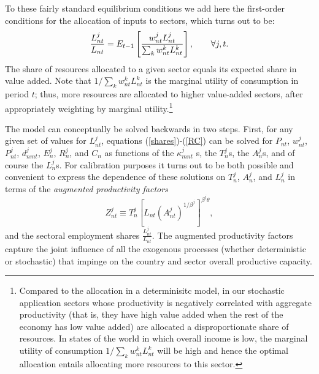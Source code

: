 \documentclass{article}
\begin{document}
To these fairly standard equilibrium conditions we add here the first-order
conditions for the allocation of inputs to sectors, which turns out to be: 
\begin{equation}
\frac{L_{nt}^{j}}{L_{nt}}=E_{t-1}\left[ \frac{w_{nt}^{j}L_{nt}^{j}}{%
\sum_{k}w_{nt}^{k}L_{nt}^{k}}\right] ,\qquad \forall j,t.  \label{eq:FOC}
\end{equation}%
The share of resources allocated to a given sector equals its expected share
in value added. Note that $1/\sum_{k}w_{nt}^{k}L_{nt}^{k}$ is the marginal
utility of consumption in period $t$; thus, more resources are allocated to
higher value-added sectors, after appropriately weighting by marginal
utility.\footnote{%
Compared to the allocation in a determinisitc model, in our stochastic
application sectors whose productivity is negatively correlated with
aggregate productivity (that is, they have high value added when the rest of
the economy has low value added) are allocated a disproportionate share of
resources. In states of the world in which overall income is low, the
marginal utility of consumption $1/\sum_{k}w_{nt}^{k}L_{nt}^{k}$ will be
high and hence the optimal allocation entails allocating more resources to
this sector.}

The model can conceptually be solved backwards in two steps. First, for any
given set of values for $L_{nt}^{j}$, equations (\ref{shares})-(\ref{RC})
can be solved for $P_{nt}$, $w_{nt}^{j}$, $P_{nt}^{j}$, $d_{nmt}^{j}$, $%
E_{n}^{j}$, $R_{n}^{j}$, and $C_{n}$ as functions of the $\kappa _{mnt}^{j}$%
s, the $T_{n}^{j}$s, the $A_{n}^{j}$s, and of course the $L_{n}^{j}$s. For
calibration purposes it turns out to be both possible and convenient to
express the dependence of these solutions on $T_{n}^{j}$, $A_{n}^{j}$, and $%
L_{n}^{j}$ in terms of the \textit{augmented productivity factors}%
\begin{equation}
Z_{nt}^{j}\equiv T_{n}^{j}\left[ L_{nt}\left( A_{nt}^{j}\right) ^{1/\beta
^{j}}\right] ^{\beta ^{j}\theta },  \label{productivityfactor}
\end{equation}%
and the sectoral employment shares $\frac{L_{nt}^{j}}{L_{nt}}$. The
augmented productivity factors capture the joint influence of all the
exogenous processes (whether deterministic or stochastic) that impinge on
the country and sector overall productive capacity.
\end{document}
